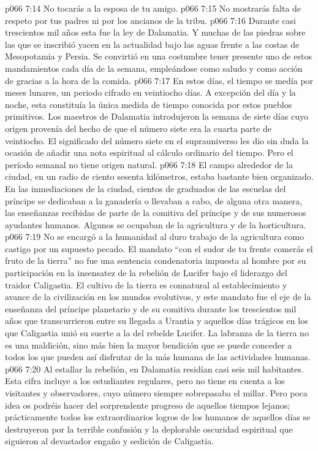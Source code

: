 \vs p066 7:14 No tocarás a la esposa de tu amigo.
\vs p066 7:15 No mostrarás falta de respeto por tus padres ni por los ancianos de la tribu.
\vs p066 7:16 \pc Durante casi trescientos mil años esta fue la ley de Dalamatia. Y muchas de las piedras sobre las que se inscribió yacen en la actualidad bajo las aguas frente a las costas de Mesopotamia y Persia. Se convirtió en una costumbre tener presente uno de estos mandamientos cada día de la semana, empleándose como saludo y como acción de gracias a la hora de la comida.
\vs p066 7:17 \pc En estos días, el tiempo se medía por meses lunares, un periodo cifrado en veintiocho días. A excepción del día y la noche, esta constituía la única medida de tiempo conocida por estos pueblos primitivos. Los maestros de Dalamatia introdujeron la semana de siete días cuyo origen provenía del hecho de que el número siete era la cuarta parte de veintiocho. El significado del número siete en el suprauniverso les dio sin duda la ocasión de añadir una nota espiritual al cálculo ordinario del tiempo. Pero el período semanal no tiene origen natural.
\vs p066 7:18 \pc El campo alrededor de la ciudad, en un radio de ciento sesenta kilómetros, estaba bastante bien organizado. En las inmediaciones de la ciudad, cientos de graduados de las escuelas del príncipe se dedicaban a la ganadería o llevaban a cabo, de alguna otra manera, las enseñanzas recibidas de parte de la comitiva del príncipe y de sus numerosos ayudantes humanos. Algunos se ocupaban de la agricultura y de la horticultura.
\vs p066 7:19 No se encargó a la humanidad al duro trabajo de la agricultura como castigo por un supuesto pecado. El mandato “con el sudor de tu frente comerás el fruto de la tierra” no fue una sentencia condenatoria impuesta al hombre por su participación en la insensatez de la rebelión de Lucifer bajo el liderazgo del traidor Caligastia. El cultivo de la tierra es connatural al establecimiento y avance de la civilización en los mundos evolutivos, y este mandato fue el eje de la enseñanza del príncipe planetario y de su comitiva durante los trescientos mil años que transcurrieron entre su llegada a Urantia y aquellos días trágicos en los que Caligastia unió su suerte a la del rebelde Lucifer. La labranza de la tierra no es una maldición, sino más bien la mayor bendición que se puede conceder a todos los que pueden así disfrutar de la más humana de las actividades humanas.
\vs p066 7:20 Al estallar la rebelión, en Dalamatia residían casi seis mil habitantes. Esta cifra incluye a los estudiantes regulares, pero no tiene en cuenta a los visitantes y observadores, cuyo número siempre sobrepasaba el millar. Pero poca idea os podréis hacer del sorprendente progreso de aquellos tiempos lejanos; prácticamente todos los extraordinarios logros de los humanos de aquellos días se destruyeron por la terrible confusión y la deplorable oscuridad espiritual que siguieron al devastador engaño y sedición de Caligastia.
